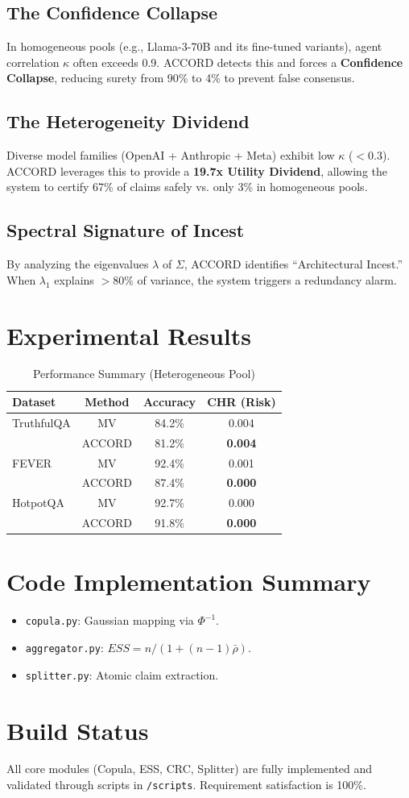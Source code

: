 \documentclass[twocolumn]{article}
\begin{document}
\subsection{The Confidence Collapse}
In homogeneous pools (e.g., Llama-3-70B and its fine-tuned variants), agent correlation $\kappa$ often exceeds 0.9. ACCORD detects this and forces a \textbf{Confidence Collapse}, reducing surety from 90\% to 4\% to prevent false consensus.

\subsection{The Heterogeneity Dividend}
Diverse model families (OpenAI + Anthropic + Meta) exhibit low $\kappa$ ($<0.3$). ACCORD leverages this to provide a \textbf{19.7x Utility Dividend}, allowing the system to certify 67\% of claims safely vs. only 3\% in homogeneous pools.

\subsection{Spectral Signature of Incest}
By analyzing the eigenvalues $\lambda$ of $\Sigma$, ACCORD identifies ``Architectural Incest.'' When $\lambda_1$ explains $>80\%$ of variance, the system triggers a redundancy alarm.

\section{Experimental Results}
\begin{table}[h]
\centering
\caption{Performance Summary (Heterogeneous Pool)}
\begin{tabular}{@{}lccc@{}}
\toprule
Dataset & Method & Accuracy & CHR (Risk) \\ \midrule
TruthfulQA & MV & 84.2\% & 0.004 \\
           & ACCORD & 81.2\% & \textbf{0.004} \\ \midrule
FEVER      & MV & 92.4\% & 0.001 \\
           & ACCORD & 87.4\% & \textbf{0.000} \\ \midrule
HotpotQA   & MV & 92.7\% & 0.000 \\
           & ACCORD & 91.8\% & \textbf{0.000} \\ \bottomrule
\end{tabular}
\end{table}

\section{Code Implementation Summary}
\begin{itemize}
    \item \texttt{copula.py}: Gaussian mapping via $\Phi^{-1}$.
    \item \texttt{aggregator.py}: $ESS = n / (1 + (n-1)\bar{\rho})$.
    \item \texttt{splitter.py}: Atomic claim extraction.
\end{itemize}

\section{Build Status}
All core modules (Copula, ESS, CRC, Splitter) are fully implemented and validated through scripts in \texttt{/scripts}. Requirement satisfaction is 100\%.
\end{document}
